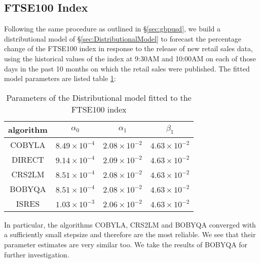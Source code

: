 \documentclass[a4paper,11pt,pdftex,twoside,titlepage]{article}
\begin{document}


\subsection{FTSE100 Index}
\label{sec:j4g53hg}
Following the same procedure as outlined in \S\ref{sec:gbpusd}, we
build a distributional model of \S\ref{sec:DistributionalModel} to
forecast the percentage change of the FTSE100 index in response to the
release of new retail sales data, using the historical values of the
index at 9:30AM and 10:00AM on each of those days in the past 10
months on which the retail sales were published. The fitted model
parameters are listed table \ref{tab:f54y6h}:
\begin{table}[htb!]
  \centering
  \begin{tabular}{c|c|c|c}
    algorithm & $\alpha_0$ & $\alpha_1$ & $\beta_1$ \\
    \hline
    COBYLA & $8.49 \times 10^{-4}$ & $2.08 \times 10^{-2}$ & $4.63 \times 10^{-2}$ \\
    DIRECT & $9.14 \times 10^{-4}$ & $2.09 \times 10^{-2}$ & $4.63 \times 10^{-2}$ \\
    CRS2LM & $8.51 \times 10^{-4}$ & $2.08 \times 10^{-2}$ & $4.63 \times 10^{-2}$ \\
    BOBYQA & $8.51 \times 10^{-4}$ & $2.08 \times 10^{-2}$ & $4.63 \times 10^{-2}$ \\
    ISRES & $1.03 \times 10^{-3}$ & $2.06 \times 10^{-2}$ & $4.63 \times 10^{-2}$ \\
    \hline
  \end{tabular}
  \caption{Parameters of the Distributional model fitted to the
    FTSE100 index}
  \label{tab:f54y6h}
\end{table}
In particular, the algorithms COBYLA, CRS2LM and BOBYQA converged with
a sufficiently small stepsize and therefore are the most reliable. We
see that their parameter estimates are very similar too. We take the
results of BOBYQA for further investigation.
\end{document}
